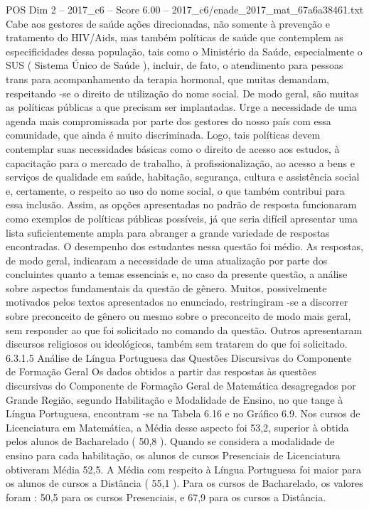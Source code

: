 \begin{textsample}{POS Dim 2 – 2017\_c6 – Score 6.00 – 2017\_c6/enade\_2017\_mat\_67a6a38461.txt}
Cabe aos gestores de saúde ações direcionadas, não somente à prevenção e tratamento do HIV/Aids, mas também políticas de saúde que contemplem as especificidades dessa população, tais como o Ministério da Saúde, especialmente o SUS ( Sistema Único de Saúde ), incluir, de fato, o atendimento para pessoas trans para acompanhamento da terapia hormonal, que muitas demandam, respeitando -se o direito de utilização do nome social.
De modo geral, são muitas as políticas públicas a que precisam ser implantadas.
Urge a necessidade de uma agenda mais compromissada por parte dos gestores do nosso país com essa comunidade, que ainda é muito discriminada.
Logo, tais políticas devem contemplar suas necessidades básicas como o direito de acesso aos estudos, à capacitação para o mercado de trabalho, à profissionalização, ao acesso a bens e serviços de qualidade em saúde, habitação, segurança, cultura e assistência social e, certamente, o respeito ao uso do nome social, o que também contribui para essa inclusão.
Assim, as opções apresentadas no padrão de resposta funcionaram como exemplos de políticas públicas possíveis, já que seria difícil apresentar uma lista suficientemente ampla para abranger a grande variedade de respostas encontradas.
O desempenho dos estudantes nessa questão foi médio.
As respostas, de modo geral, indicaram a necessidade de uma atualização por parte dos concluintes quanto a temas essenciais e, no caso da presente questão, a análise sobre aspectos fundamentais da questão de gênero.
Muitos, possivelmente motivados pelos textos apresentados no enunciado, restringiram -se a discorrer sobre preconceito de gênero ou mesmo sobre o preconceito de modo mais geral, sem responder ao que foi solicitado no comando da questão.
Outros apresentaram discursos religiosos ou ideológicos, também sem tratarem do que foi solicitado. 6.3.1.5 Análise de Língua Portuguesa das Questões Discursivas do Componente de Formação Geral Os dados obtidos a partir das respostas às questões discursivas do Componente de Formação Geral de Matemática desagregados por Grande Região, segundo Habilitação e Modalidade de Ensino, no que tange à Língua Portuguesa, encontram -se na Tabela 6.16 e no Gráfico 6.9.
Nos cursos de Licenciatura em Matemática, a Média desse aspecto foi 53,2, superior à obtida pelos alunos de Bacharelado ( 50,8 ).
Quando se considera a modalidade de ensino para cada habilitação, os alunos de cursos Presenciais de Licenciatura obtiveram Média 52,5.
A Média com respeito à Língua Portuguesa foi maior para os alunos de cursos a Distância ( 55,1 ).
Para os cursos de Bacharelado, os valores foram : 50,5 para os cursos Presenciais, e 67,9 para os cursos a Distância.

\end{textsample}
